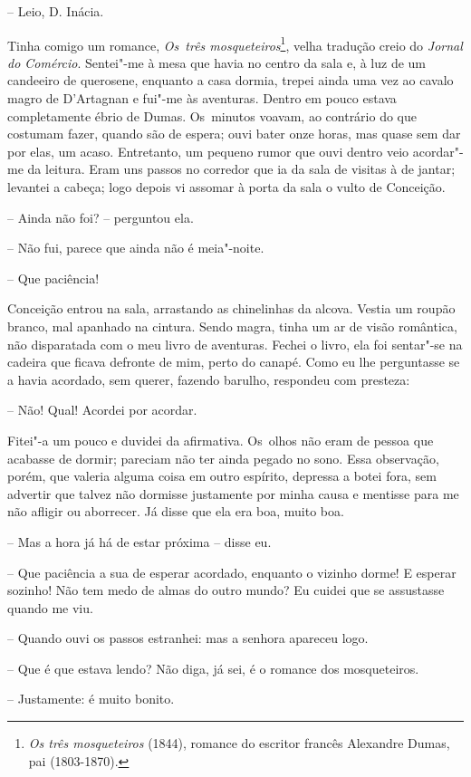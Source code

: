 -- Leio, D. Inácia.

Tinha comigo um romance, \emph{Os~três mosqueteiros}\footnote{\emph{Os
  três mosqueteiros} (1844), romance do escritor francês Alexandre
  Dumas, pai (1803-1870).}, velha tradução creio do \emph{Jornal do
Comércio}. Sentei"-me à mesa que havia no centro da sala e, à luz de um
candeeiro de querosene, enquanto a casa dormia, trepei ainda uma vez ao
cavalo magro de D'Artagnan e fui"-me às aventuras. Dentro em pouco estava
completamente ébrio de Dumas. Os~minutos voavam, ao contrário do que
costumam fazer, quando são de espera; ouvi bater onze horas, mas quase
sem dar por elas, um acaso. Entretanto, um pequeno rumor que ouvi dentro
veio acordar"-me da leitura. Eram uns passos no corredor que ia da sala
de visitas à de jantar; levantei a cabeça; logo depois vi assomar à
porta da sala o vulto de Conceição.

-- Ainda não foi? -- perguntou ela.

-- Não fui, parece que ainda não é meia"-noite.

-- Que paciência!

Conceição entrou na sala, arrastando as chinelinhas da alcova. Vestia um
roupão branco, mal apanhado na cintura. Sendo magra, tinha um ar de
visão romântica, não disparatada com o meu livro de aventuras. Fechei o
livro, ela foi sentar"-se na cadeira que ficava defronte de mim, perto do
canapé. Como eu lhe perguntasse se a havia acordado, sem querer, fazendo
barulho, respondeu com presteza:

-- Não! Qual! Acordei por acordar.

Fitei"-a um pouco e duvidei da afirmativa. Os~olhos não eram de pessoa
que acabasse de dormir; pareciam não ter ainda pegado no sono. Essa
observação, porém, que valeria alguma coisa em outro espírito, depressa
a botei fora, sem advertir que talvez não dormisse justamente por minha
causa e mentisse para me não afligir ou aborrecer. Já disse que ela era
boa, muito boa.

-- Mas a hora já há de estar próxima -- disse eu.

-- Que paciência a sua de esperar acordado, enquanto o vizinho dorme! E
esperar sozinho! Não tem medo de almas do outro mundo? Eu cuidei que se
assustasse quando me viu.

-- Quando ouvi os passos estranhei: mas a senhora apareceu logo.

-- Que é que estava lendo? Não diga, já sei, é o romance dos
mosqueteiros.

-- Justamente: é muito bonito.

